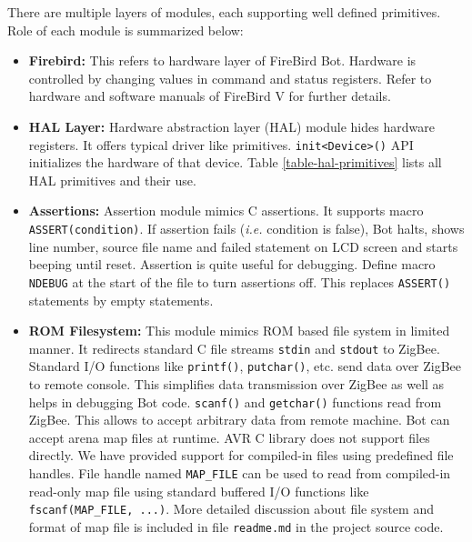 \documentclass[a4paper, 12pt]{article}
\begin{document}
There are multiple layers of modules, each supporting well defined primitives. Role of each module is 
summarized below:
\begin{itemize}
 \item \textbf{Firebird:} This refers to hardware layer of FireBird Bot. Hardware is controlled by changing
  values in command and status registers. Refer to hardware \cite{fbhwmanual} and software \cite{fbswmanual} 
  manuals of FireBird V for further details.
  
  \item \textbf{HAL Layer:} Hardware abstraction layer (HAL) module hides hardware registers. It offers
  typical driver like primitives. \texttt{init<Device>()} API initializes the hardware of that device. Table \ref{table-hal-primitives} lists all HAL primitives and their use.
  
  \item \textbf{Assertions:} Assertion module mimics C assertions. It supports macro 
  \texttt{ASSERT(condition)}. If assertion fails (\emph{i.e.} condition is false), Bot halts, shows
  line number, source file name and failed statement on LCD screen and starts beeping until reset. Assertion
  is quite useful for debugging. Define macro \texttt{NDEBUG} at the start of the file to turn assertions off. This replaces \texttt{ASSERT()}
  statements by empty statements.
  
  \item \textbf{ROM Filesystem:} This module mimics ROM based file system in limited manner. It redirects standard
  C file streams \texttt{stdin} and \texttt{stdout} to ZigBee. Standard I/O functions  like \texttt{printf()}, \texttt{putchar()}, etc.
  send data over ZigBee to remote console. This simplifies data transmission over ZigBee
  as well as helps in debugging Bot code.  
  \texttt{scanf()} and \texttt{getchar()} functions read from ZigBee. This allows to accept arbitrary data from
  remote machine. Bot can accept arena map files at runtime.
  AVR C library does not support files directly. We have provided support for compiled-in files using predefined
  file handles. File handle named \texttt{MAP\_FILE} can be used to read from compiled-in read-only map file using
  standard buffered I/O functions like \texttt{fscanf(MAP\_FILE, ...)}. More detailed discussion about file system
  and format of map file is included in file \texttt{readme.md} in the project source code.
  

\end{itemize}
\end{document}

